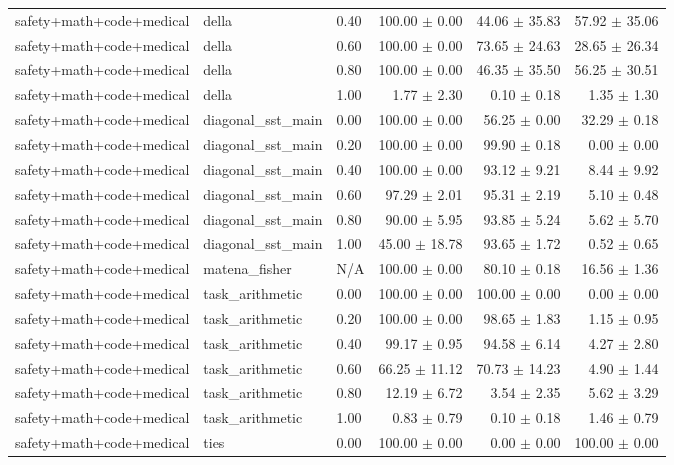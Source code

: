 \begin{table}[H]
{\begin{tabular}{lllrrr}
safety+math+code+medical & della & 0.40 & 100.00 $\pm$ 0.00 & 44.06 $\pm$ 35.83 & 57.92 $\pm$ 35.06 \\
safety+math+code+medical & della & 0.60 & 100.00 $\pm$ 0.00 & 73.65 $\pm$ 24.63 & 28.65 $\pm$ 26.34 \\
safety+math+code+medical & della & 0.80 & 100.00 $\pm$ 0.00 & 46.35 $\pm$ 35.50 & 56.25 $\pm$ 30.51 \\
safety+math+code+medical & della & 1.00 & 1.77 $\pm$ 2.30 & 0.10 $\pm$ 0.18 & 1.35 $\pm$ 1.30 \\
safety+math+code+medical & diagonal\_sst\_main & 0.00 & 100.00 $\pm$ 0.00 & 56.25 $\pm$ 0.00 & 32.29 $\pm$ 0.18 \\
safety+math+code+medical & diagonal\_sst\_main & 0.20 & 100.00 $\pm$ 0.00 & 99.90 $\pm$ 0.18 & 0.00 $\pm$ 0.00 \\
safety+math+code+medical & diagonal\_sst\_main & 0.40 & 100.00 $\pm$ 0.00 & 93.12 $\pm$ 9.21 & 8.44 $\pm$ 9.92 \\
safety+math+code+medical & diagonal\_sst\_main & 0.60 & 97.29 $\pm$ 2.01 & 95.31 $\pm$ 2.19 & 5.10 $\pm$ 0.48 \\
safety+math+code+medical & diagonal\_sst\_main & 0.80 & 90.00 $\pm$ 5.95 & 93.85 $\pm$ 5.24 & 5.62 $\pm$ 5.70 \\
safety+math+code+medical & diagonal\_sst\_main & 1.00 & 45.00 $\pm$ 18.78 & 93.65 $\pm$ 1.72 & 0.52 $\pm$ 0.65 \\
safety+math+code+medical & matena\_fisher & N/A & 100.00 $\pm$ 0.00 & 80.10 $\pm$ 0.18 & 16.56 $\pm$ 1.36 \\
safety+math+code+medical & task\_arithmetic & 0.00 & 100.00 $\pm$ 0.00 & 100.00 $\pm$ 0.00 & 0.00 $\pm$ 0.00 \\
safety+math+code+medical & task\_arithmetic & 0.20 & 100.00 $\pm$ 0.00 & 98.65 $\pm$ 1.83 & 1.15 $\pm$ 0.95 \\
safety+math+code+medical & task\_arithmetic & 0.40 & 99.17 $\pm$ 0.95 & 94.58 $\pm$ 6.14 & 4.27 $\pm$ 2.80 \\
safety+math+code+medical & task\_arithmetic & 0.60 & 66.25 $\pm$ 11.12 & 70.73 $\pm$ 14.23 & 4.90 $\pm$ 1.44 \\
safety+math+code+medical & task\_arithmetic & 0.80 & 12.19 $\pm$ 6.72 & 3.54 $\pm$ 2.35 & 5.62 $\pm$ 3.29 \\
safety+math+code+medical & task\_arithmetic & 1.00 & 0.83 $\pm$ 0.79 & 0.10 $\pm$ 0.18 & 1.46 $\pm$ 0.79 \\
safety+math+code+medical & ties & 0.00 & 100.00 $\pm$ 0.00 & 0.00 $\pm$ 0.00 & 100.00 $\pm$ 0.00 \\

\end{tabular}}
\end{table}
